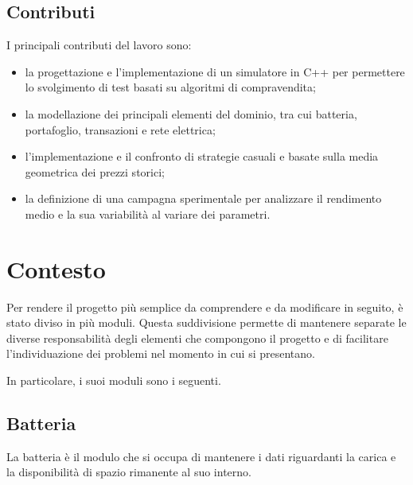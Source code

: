 \documentclass[a4paper,oneside,italian]{sapthesis}
\begin{document}
\clearpage
\section{Contributi}

I principali contributi del lavoro sono:

\begin{itemize}

    \item la progettazione e l'implementazione di un simulatore in C++
          per permettere lo svolgimento di test basati su algoritmi di compravendita;

    \item la modellazione dei principali elementi del dominio, tra cui
          batteria, portafoglio, transazioni e rete elettrica;

    \item l'implementazione e il confronto di strategie casuali e basate sulla
          media geometrica dei prezzi storici;

    \item la definizione di una campagna sperimentale per analizzare il
          rendimento medio e la sua variabilità al variare dei parametri.

\end{itemize}


\chapter{Contesto}
\label{chap:background}

Per rendere il progetto più semplice da comprendere e da modificare in seguito, 
è stato diviso in più moduli. Questa suddivisione permette di mantenere separate 
le diverse responsabilità degli elementi che compongono il progetto e di facilitare 
l'individuazione dei problemi nel momento in cui si presentano.

In particolare, i suoi moduli sono i seguenti.

\section{Batteria}

La batteria è il modulo che si occupa di mantenere i dati riguardanti la carica 
e la disponibilità di spazio rimanente al suo interno.
\end{document}
